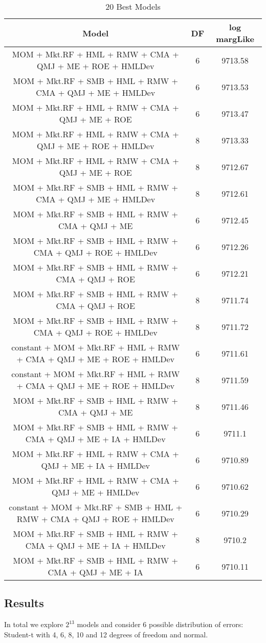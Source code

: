\begin{table}[ht]
	\footnotesize
	\centering
	\begin{tabular}{ccc}
		\hline
		Model & DF & log margLike \\ 
		\hline
		MOM + Mkt.RF + HML + RMW + CMA + QMJ + ME + ROE + HMLDev & 6 & 9713.58 \\ 
		MOM + Mkt.RF + SMB + HML + RMW + CMA + QMJ + ME + HMLDev & 6 & 9713.53 \\ 
		MOM + Mkt.RF + HML + RMW + CMA + QMJ + ME + ROE & 6 & 9713.47 \\ 
		MOM + Mkt.RF + HML + RMW + CMA + QMJ + ME + ROE + HMLDev & 8 & 9713.33 \\ 
		MOM + Mkt.RF + HML + RMW + CMA + QMJ + ME + ROE & 8 & 9712.67 \\ 
		MOM + Mkt.RF + SMB + HML + RMW + CMA + QMJ + ME + HMLDev & 8 & 9712.61 \\ 
		MOM + Mkt.RF + SMB + HML + RMW + CMA + QMJ + ME & 6 & 9712.45 \\ 
		MOM + Mkt.RF + SMB + HML + RMW + CMA + QMJ + ROE + HMLDev & 6 & 9712.26 \\ 
		MOM + Mkt.RF + SMB + HML + RMW + CMA + QMJ + ROE & 6 & 9712.21 \\ 
		MOM + Mkt.RF + SMB + HML + RMW + CMA + QMJ + ROE & 8 & 9711.74 \\ 
		MOM + Mkt.RF + SMB + HML + RMW + CMA + QMJ + ROE + HMLDev & 8 & 9711.72 \\ 
		constant + MOM + Mkt.RF + HML + RMW + CMA + QMJ + ME + ROE + HMLDev & 6 & 9711.61 \\ 
		constant + MOM + Mkt.RF + HML + RMW + CMA + QMJ + ME + ROE + HMLDev & 8 & 9711.59 \\ 
		MOM + Mkt.RF + SMB + HML + RMW + CMA + QMJ + ME & 8 & 9711.46 \\ 
		MOM + Mkt.RF + SMB + HML + RMW + CMA + QMJ + ME + IA + HMLDev & 6 & 9711.1 \\ 
		MOM + Mkt.RF + HML + RMW + CMA + QMJ + ME + IA + HMLDev & 6 & 9710.89 \\ 
		MOM + Mkt.RF + HML + RMW + CMA + QMJ + ME + HMLDev & 6 & 9710.62 \\ 
		constant + MOM + Mkt.RF + SMB + HML + RMW + CMA + QMJ + ROE + HMLDev & 6 & 9710.29 \\ 
		MOM + Mkt.RF + SMB + HML + RMW + CMA + QMJ + ME + IA + HMLDev & 8 & 9710.2 \\ 
		MOM + Mkt.RF + SMB + HML + RMW + CMA + QMJ + ME + IA & 6 & 9710.11 \\ 
		\hline
	\end{tabular}
		\caption{20 Best Models}
\end{table}
\subsection{Results}
In total we explore $2^{13}$ models and consider 6 possible distribution of errors: Student-t with 4, 6, 8, 10 and 12 degrees of freedom and normal. 

